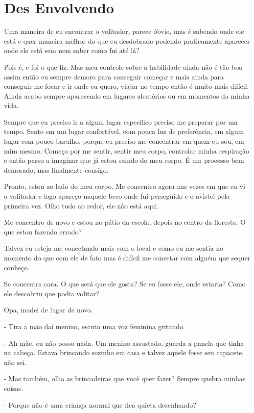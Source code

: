 \chapter{Des Envolvendo}
Uma maneira de eu encontrar o volitador, parece óbvio, mas é sabendo onde ele está e quer maneira melhor do que eu desdobrado podendo praticamente aparecer onde ele está sem nem saber como fui até lá? 

Pois é, e foi o que fiz. Mas meu controle sobre a habilidade ainda não é tão boa assim então eu sempre demoro para conseguir começar e mais ainda para conseguir me focar e ir onde eu quero, viajar no tempo então é muito mais difícil. Ainda acabo sempre aparecendo em lugares aleatórios ou em momentos da minha vida.

Sempre que eu preciso ir a algum lugar específico preciso me preparar por um tempo. Sento em um lugar confortável, com pouca luz de preferência, em algum lugar com pouco barulho, porque eu preciso me concentrar em quem eu sou, em mim mesmo. Começo por me sentir, sentir meu corpo, controlar minha respiração e então passo a imaginar que já estou saindo do meu corpo. É um processo bem demorado, mas finalmente consigo.

Pronto, estou ao lado do meu corpo. Me concentro agora nas vezes em que eu vi o volitador e logo apareço naquele beco onde fui perseguido e o avistei pela primeira vez. Olho tudo ao redor, ele não está aqui.

Me concentro de novo e estou no pátio da escola, depois no centro da floresta. O que estou fazendo errado?

Talvez eu esteja me conectando mais com o local e como eu me sentia no momento do que com ele de fato mas é difícil me conectar com alguém que sequer conheço.

Se concentra cara. O que será que ele gosta? Se eu fosse ele, onde estaria? Como ele descobriu que podia volitar?

Opa, mudei de lugar de novo.

- Tira a mão daí menino, escuto uma voz feminina gritando.

- Ah mãe, eu não posso nada. Um menino assustado, guarda a panela que tinha na cabeça. Estava brincando sozinho em casa e talvez aquele fosse seu capacete, não sei.

- Mas também, olha as brincadeiras que você quer fazer? Sempre quebra minhas coisas.

- Porque não é uma criança normal que fica quieta desenhando?


